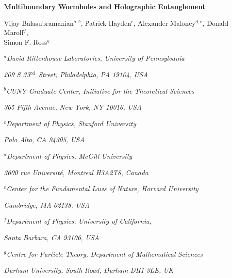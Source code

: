 \documentclass[12pt]{article}
\newcommand{\bbibitem}[1]{\bibitem{#1}\marginpar{#1}}
\def\Label#1{\label{#1}%
  \smash{\hbox to0pt{\raise1ex\hbox{\tiny[#1]}\hss}}}
\def\noLabels{\let\Label=\label}
\def\nobbibitem{\let\bbibitem=\bibitem}
\numberwithin{equation}{section}
\begin{document}
\clearpage\thispagestyle{empty}

\begin{center}


{\Large \bf
Multiboundary Wormholes and  Holographic Entanglement}

\vspace{7mm}

Vijay Balasubramanian$^{a,b}$, Patrick Hayden$^{c}$, Alexander Maloney$^{d,e}$,  Donald Marolf$^{f}$, \\
Simon F. Ross$^{g}$  \\






\bigskip\centerline{$^a$\it David Rittenhouse Laboratories, University of Pennsylvania}
\smallskip\centerline{\it 209 S 33$^{\rm rd}$ Street, Philadelphia, PA 19104, USA}
\bigskip\centerline{$^b$\it CUNY Graduate Center, Initiative for the Theoretical Sciences}
\smallskip\centerline{\it 365 Fifth Avenue, New York, NY 10016, USA}
\bigskip\centerline{$^c$\it Department of Physics, Stanford University}
\smallskip\centerline{\it Palo Alto, CA 94305, USA}
\bigskip\centerline{$^d$\it Department of Physics, McGill University}
\smallskip\centerline{\it 3600 rue Universit\'{e}, Montreal H3A2T8, Canada}
\bigskip\centerline{$^e$\it Center for the Fundamental Laws of Nature, Harvard University}
\smallskip\centerline{\it Cambridge, MA 02138, USA}
\bigskip\centerline{$^f$\it Department of Physics, University of California,}
\smallskip\centerline{\it Santa Barbara, CA 93106, USA}
\bigskip\centerline{$^g$\it Centre for Particle Theory, Department of Mathematical Sciences}
\smallskip\centerline{\it Durham University, South Road, Durham DH1 3LE, UK}
\end{center}

\vspace{5mm}
\end{document}
